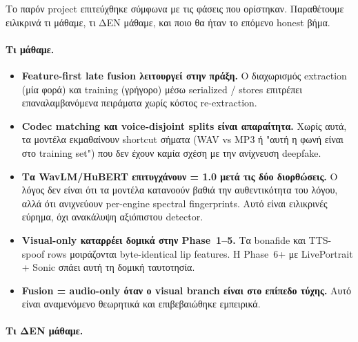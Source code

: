 Το παρόν project επιτεύχθηκε σύμφωνα με τις φάσεις που ορίστηκαν.
Παραθέτουμε ειλικρινά τι μάθαμε, τι ΔΕΝ μάθαμε,
και ποιο θα ήταν το επόμενο honest βήμα.

\paragraph{Τι μάθαμε.}

\begin{itemize}
  \item \textbf{Feature-first late fusion λειτουργεί στην πράξη.}
        Ο διαχωρισμός extraction (μία φορά) και training (γρήγορο)
        μέσω serialized / stores
        επιτρέπει επαναλαμβανόμενα πειράματα
        χωρίς κόστος re-extraction.

  \item \textbf{Codec matching και voice-disjoint splits είναι απαραίτητα.}
        Χωρίς αυτά, τα μοντέλα εκμαθαίνουν shortcut σήματα
        (WAV vs MP3 ή "αυτή η φωνή είναι στο training set")
        που δεν έχουν καμία σχέση με την ανίχνευση deepfake.

  \item \textbf{Τα WavLM/HuBERT επιτυγχάνουν \AUC{} = 1.0 μετά τις δύο διορθώσεις.}
        Ο λόγος δεν είναι ότι τα μοντέλα κατανοούν βαθιά
        την αυθεντικότητα του λόγου,
        αλλά ότι ανιχνεύουν per-engine spectral fingerprints.
        Αυτό είναι ειλικρινές εύρημα, όχι ανακάλυψη αξιόπιστου detector.

  \item \textbf{Visual-only καταρρέει δομικά στην Phase~1–5.}
        Τα bonafide και TTS-spoof rows μοιράζονται byte-identical lip features.
        Η Phase~6+ με LivePortrait + Sonic σπάει αυτή τη δομική ταυτοτησία.

  \item \textbf{Fusion = audio-only όταν ο visual branch είναι στο επίπεδο τύχης.}
        Αυτό είναι αναμενόμενο θεωρητικά και επιβεβαιώθηκε εμπειρικά.
\end{itemize}

\paragraph{Τι ΔΕΝ μάθαμε.}

